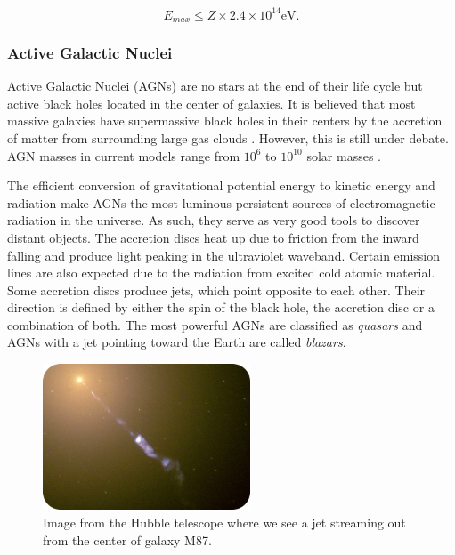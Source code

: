 \begin{equation}
E_{max} \leq Z \times 2.4 \times 10^{14} \textrm{eV}.
\end{equation}

\subsubsection{Active Galactic Nuclei}
\label{subsubsec:agn}
Active Galactic Nuclei (AGNs) are no stars at the end of their life cycle but active black holes located in the center of galaxies. It is believed that most massive galaxies have supermassive black holes in their centers by the accretion of matter from surrounding large gas clouds \cite{Urry:1995mg,Antonucci:1993sg}. However, this is still under debate. AGN masses in current models range from $10^6$ to $10^{10}$ solar masses \cite{Kazanas:2012sk}.

The efficient conversion of gravitational potential energy to kinetic energy and radiation make AGNs the most luminous persistent sources of electromagnetic radiation in the universe. As such, they serve as very good tools to discover distant objects. The accretion discs heat up due to friction from the inward falling and produce light peaking in the ultraviolet waveband. Certain emission lines are also expected due to the radiation from excited cold atomic material. Some accretion discs produce jets, which point opposite to each other. Their direction is defined by either the spin of the black hole, the accretion disc or a combination of both.  The most powerful AGNs are classified as \textit{quasars} and AGNs with a jet pointing toward the Earth are called \textit{blazars}.

\begin{figure}
\centering
\includegraphics[width=0.55\textwidth]{chapter3/img/jet_crop_rounded.jpg}
\caption{
Image from the Hubble telescope where we see a jet streaming out from the center of galaxy M87.}
\end{figure}

